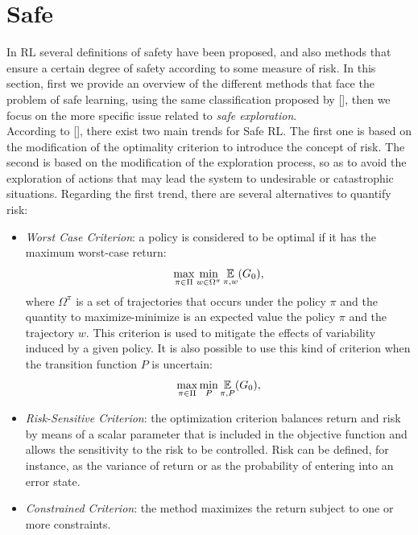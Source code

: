\section{Safe }\label{sec:saferl}
In \ac{RL} several definitions of safety have been proposed, and also methods that ensure a certain degree of safety according to some measure of risk. In this section, first we provide an overview of the different methods that face the problem of safe learning, using the same classification proposed by [\citeauthor{JMLR:v16:garcia15a}], then we focus on the more specific issue related to \emph{safe exploration}.\\
\newline
According to [\cite{JMLR:v16:garcia15a}], there exist two main trends for Safe \ac{RL}. The first one is based on the modification of the optimality criterion to introduce the concept of risk. The second is based on the modification of the exploration process, so as to avoid the exploration of actions that may lead the system to undesirable or catastrophic situations. Regarding the first trend, there are several alternatives to quantify risk:
\begin{itemize}
	\item \emph{Worst Case Criterion}: a policy is considered to be optimal if it has the maximum worst-case return:
	\begin{align}
	\max_{\pi \in \Pi}\min_{w \in \Omega^{\pi}} \operatorname*{\mathbb{E}}_{\pi, w}(G_{0}),
	\end{align}
	where $\Omega^{\pi}$ is a set of trajectories that occurs under the policy $\pi$ and the quantity to maximize-minimize is an expected value \wrt the policy $\pi$ and the trajectory $w$.	This criterion is used to mitigate the effects of variability induced by a given policy. It is also possible to use this kind of criterion when the transition function $P$ is uncertain:
	\begin{align}
	\max_{\pi \in \Pi}\min_{P} \operatorname*{\mathbb{E}}_{\pi, P}(G_{0}),
	\end{align}
	\item \emph{Risk-Sensitive Criterion}: the optimization criterion balances return and risk by means of a scalar parameter that is included in the objective function and allows the sensitivity to the risk to be controlled. Risk can be defined, for instance, as the variance of return or as the probability of entering into an error state.
	\item \emph{Constrained Criterion}: the method maximizes the return subject to one or more constraints.
\end{itemize}
